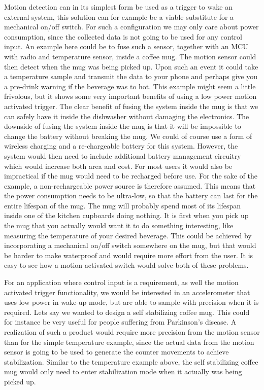 Motion detection can in its simplest form be used as a trigger to wake an external system, this solution can for example be a viable substitute for a mechanical on/off switch. For such a configuration we may only care about power consumption, since the collected data is not going to be used for any control input. An example here could be to fuse such a sensor, together with an MCU with radio and temperature sensor, inside a coffee mug. The motion sensor could then detect when the mug was being picked up. Upon such an event it could take a temperature sample and transmit the data to your phone and perhaps give you a pre-drink warning if the beverage was to hot. This example might seem a little frivolous, but it shows some very important benefits of using a low power motion activated trigger. The clear benefit of fusing the system inside the mug is that we can safely have it inside the dishwasher without damaging the electronics. The downside of fusing the system inside the mug is that it will be impossible to change the battery without breaking the mug. We could of course use a form of wireless charging and a re-chargeable battery for this system. However, the system would then need to include additional battery management circuitry which would increase both area and cost. For most users it would also be impractical if the mug would need to be recharged before use. For the sake of the example, a non-rechargeable power source is therefore assumed. This means that the power consumption needs to be ultra-low, so that the battery can last for the entire lifespan of the mug. The mug will probably spend most of its lifespan inside one of the kitchen cupboards doing nothing. It is first when you pick up the mug that you actually would want it to do something interesting, like measuring the temperature of your desired beverage. This could be achieved by incorporating a mechanical on/off switch somewhere on the mug, but that would be harder to make waterproof and would require more effort from the user. It is easy to see how a motion activated switch would solve both of these problems. 

For an application where control input is a requirement, as well the motion activated trigger functionality, we would be interested in an accelerometer that uses low power in wake-up mode, but are able to sample with precision when it is required. Lets say we wanted to design a self stabilizing coffee mug. This could for instance be very useful for people suffering from Parkinson's disease. A realization of such a product would require more precision from the motion sensor than for the simple temperature example, since the actual data from the motion sensor is going to be used to generate the counter movements to achieve stabilization. Similar to the temperature example above, the self stabilizing coffee mug would only need to enter stabilization mode when it actually was being picked up. 

